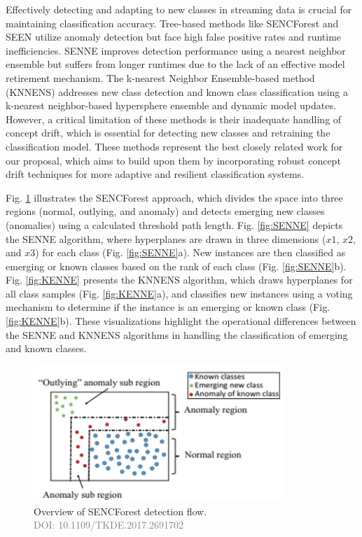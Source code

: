 Effectively detecting and adapting to new classes in streaming data is crucial for maintaining classification accuracy. Tree-based methods like SENCForest and SEEN utilize anomaly detection but face high false positive rates and runtime inefficiencies. SENNE improves detection performance using a nearest neighbor ensemble but suffers from longer runtimes due to the lack of an effective model retirement mechanism. The k-nearest Neighbor Ensemble-based method (KNNENS) addresses new class detection and known class classification using a k-nearest neighbor-based hypersphere ensemble and dynamic model updates. However, a critical limitation of these methods is their inadequate handling of concept drift, which is essential for detecting new classes and retraining the classification model. These methods represent the best closely related work for our proposal, which aims to build upon them by incorporating robust concept drift techniques for more adaptive and resilient classification systems.

Fig. \ref{fig:SENCForest} illustrates the SENCForest approach, which divides the space into three regions (normal, outlying, and anomaly) and detects emerging new classes (anomalies) using a calculated threshold path length. Fig. \ref{fig:SENNE} depicts the SENNE algorithm, where hyperplanes are drawn in three dimensions ($x1$, $x2$, and $x3$) for each class (Fig. \ref{fig:SENNE}a). New instances are then classified as emerging or known classes based on the rank of each class (Fig. \ref{fig:SENNE}b). Fig. \ref{fig:KENNE} presents the KNNENS algorithm, which draws hyperplanes for all class samples (Fig. \ref{fig:KENNE}a), and classifies new instances using a voting mechanism to determine if the instance is an emerging or known class (Fig. \ref{fig:KENNE}b). These visualizations highlight the operational differences between the SENNE and KNNENS algorithms in handling the classification of emerging and known classes.

\begin{figure}[!ht]
    \centering
    \includegraphics[width=0.85\textwidth]{3_State-of-the-art/fig/SENCForst.png}
    \caption{Overview of SENCForest detection flow. \\
    \textcolor{gray}{\fontsize{10}{0}\selectfont DOI: 10.1109/TKDE.2017.2691702}}
    \label{fig:SENCForest}
\end{figure}
    

